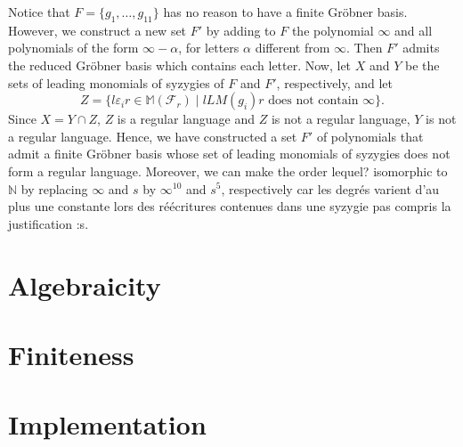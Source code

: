 \documentclass[sigconf]{acmart}
\theoremstyle{plain}
\theoremstyle{definition}
\theoremstyle{remark}
\newcommand{\N}{\mathbb{N}}
\newcommand{\MM}{\mathbb M}
\newcommand{\LM}{LM}
\newcommand\fixmecc[1]{{\color{red}{\underline{\bf C:}} #1}}
\begin{document}
Notice that $F=\{g_1,\dots,g_{11}\}$ has no reason to have a finite Gröbner basis. However, we construct a new set $F'$ by adding to $F$ the polynomial $\infty$ and all polynomials of the form $\infty-\alpha$, for letters $\alpha$ different from $\infty$. Then $F'$ admits the reduced Gröbner basis which contains each letter.
Now, let $X$ and $Y$ be the sets of leading monomials of syzygies of $F$ and $F'$, respectively, and let 
$$Z=\{l\varepsilon_ir \in \MM(\mathscr{F}_r) \;|\; l \LM(g_i) r \mbox{ does not contain } \infty\}.$$
Since $X=Y\cap Z$, $Z$ is a regular language and $Z$ is not a regular language, $Y$ is not a regular language. Hence, we have constructed a set $F'$ of polynomials that admit a finite Gröbner basis whose set of leading monomials of syzygies does not form a regular language. Moreover, we can make the order \fixmecc{lequel?} isomorphic to $\N$
by replacing $\infty$ and $s$  by $\infty^{10}$ and $s^5$, respectively car les degrés varient d'au plus une constante lors des réécritures contenues dans une syzygie \fixmecc{pas compris la justification :s}.



\section{Algebraicity}

\section{Finiteness}

\section{Implementation}
\end{document}
